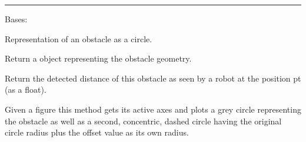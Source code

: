 \documentclass[letterpaper,10pt,english]{sphinxmanual}
\begin{document}
\bigskip\hrule{}\bigskip


\begin{fulllineitems}
\label{Multi-robot motion planner:planning_sim.RoundObstacle}
Bases: {\hyperref[Multi-robot motion planner:planning_sim.Obstacle]{}}

Representation of an obstacle as a circle.

\begin{fulllineitems}
\label{Multi-robot motion planner:planning_sim.RoundObstacle._plt_circle}
Return a \href{http://matplotlib.org/api/patches\_api.html\#matplotlib.patches.Circle}{} object representing the obstacle
geometry.

\end{fulllineitems}


\begin{fulllineitems}
\label{Multi-robot motion planner:planning_sim.RoundObstacle.detected_dist}
Return the detected distance of this obstacle as seen by a robot at the position pt
(as a float).

\end{fulllineitems}


\begin{fulllineitems}
\label{Multi-robot motion planner:planning_sim.RoundObstacle.plot}
Given a figure this method gets its active axes and plots a grey circle representing
the obstacle as well as a second, concentric, dashed circle having the original circle
radius plus the offset value as its own radius.

\end{fulllineitems}



\end{fulllineitems}
\end{document}
